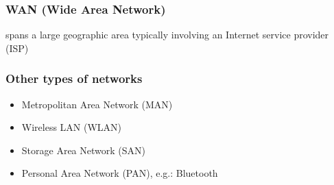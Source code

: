 \documentclass[11pt]{article}
\begin{document}
    \subsubsection{WAN  (Wide Area Network) }
    spans a large geographic area typically involving an Internet service provider (ISP)
    \subsubsection{Other types of networks}
    \begin{itemize}
        \item Metropolitan Area Network (MAN)
        \item Wireless LAN (WLAN)
        \item Storage Area Network (SAN)
        \item Personal Area Network (PAN), e.g.: Bluetooth
    \end{itemize}
\end{document}
